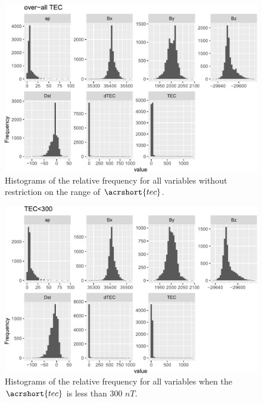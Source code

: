 \documentclass[sn-mathphys-num]{sn-jnl}%
\begin{document}
\begin{figure}
    \centering
    \includegraphics[width=0.9\linewidth]{allTEC_fix.pdf}
    \caption{Histograms of the relative frequency for all variables without restriction on the range of $\acrshort{tec}$.}
    \label{fig:allTEC}
\end{figure}

\begin{figure}
 \centering
 \includegraphics[width=0.9\linewidth]{300TEC_fix.pdf}
    \caption{Histograms of the relative frequency for all variables when the $\acrshort{tec}$ is less than $300$ $nT$.}
    \label{fig:300TEC}
\end{figure}
\end{document}
